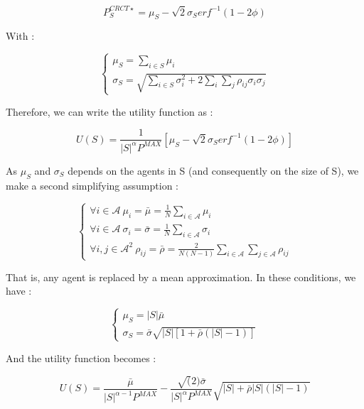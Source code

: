 \documentclass[journal]{IEEEtran}
\begin{document}
\begin{equation}
	P_S^{CRCT \star } = \mu_S - \sqrt{2} \sigma_S erf^{-1}(1 - 2 \phi)
\end{equation}

With : 

\begin{equation}
	\left\{ \begin{array}{lll} \mu_{S} = \sum_{i \in S} \mu_i \\ \sigma_{S} = \sqrt{ \sum_{i \in S} \sigma_i^2 + 2 \sum_{i} \sum_{j} \rho_{ij} \sigma_i \sigma_j } \end{array} \right.
\end{equation}


Therefore, we can write the utility function as :

\begin{equation}
	U(S) = \frac{1}{|S|^{\alpha} P^{MAX} } \left[ \mu_S - \sqrt{2} \sigma_S erf^{-1}(1 - 2 \phi) \right]
\end{equation}

As $ \mu_S $ and $ \sigma_S $ depends on the agents in S (and consequently on the size of S), we make a second simplifying assumption :

\begin{equation}
	\left\{ \begin{array}{lll} \forall i \in \mathcal{A}\ \mu_i = \bar{ \mu } = \frac{1}{N} \sum_{i \in \mathcal{A}} \mu_i  \\ \forall i \in \mathcal{A}\ \sigma_i = \bar{ \sigma } = \frac{1}{N} \sum_{i \in \mathcal{A}} \sigma_i \\ \forall i,j \in \mathcal{A}^2\  \rho_{ij} = \bar{ \rho } = \frac{2}{N(N-1)} \sum_{i \in \mathcal{A}} \sum_{j \in \mathcal{A}} \rho_{ij} \end{array} \right.
\end{equation}

That is, any agent is replaced by a mean approximation. In these conditions, we have :

\begin{equation}
	\left\{ \begin{array}{lll} 
				\mu_S = |S| \bar{\mu} \\
				\sigma_S = \bar{\sigma} \sqrt{|S| \left[ 1 + \bar{\rho} (|S|-1) \right] }	
	\end{array} \right.
\end{equation}

And the utility function becomes :

\begin{equation}
	U(S) = \frac{ \bar{ \mu } }{ |S|^{\alpha -1} P^{MAX} } - \frac{ \sqrt(2) \bar{ \sigma } }{ |S|^{\alpha} P^{MAX} } \sqrt{|S| + \bar{ \rho } |S| ( |S| - 1 ) }
\end{equation}
\end{document}
